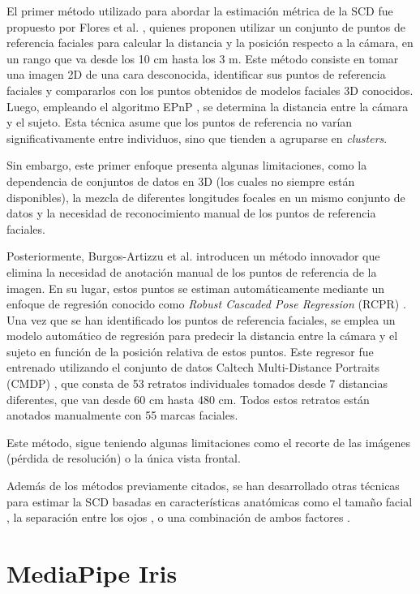 El primer método utilizado para abordar la estimación métrica de la SCD fue propuesto por Flores et al. \cite{28}, quienes proponen utilizar un conjunto de puntos de referencia faciales para calcular la distancia y la posición respecto a la cámara, en un rango que va desde los 10 cm hasta los 3 m.
Este método consiste en tomar una imagen 2D de una cara desconocida, identificar sus puntos de referencia faciales y compararlos con los puntos obtenidos de modelos faciales 3D conocidos. Luego, empleando el algoritmo EPnP \cite{29}, se determina la distancia entre la cámara y el sujeto. Esta técnica asume que los puntos de referencia no varían significativamente entre individuos, sino que tienden a agruparse en \textit{clusters}.

Sin embargo, este primer enfoque presenta algunas limitaciones, como la dependencia de conjuntos de datos en 3D (los cuales no siempre están disponibles), la mezcla de diferentes longitudes focales en un mismo conjunto de datos y la necesidad de reconocimiento manual de los puntos de referencia faciales.

Posteriormente, Burgos-Artizzu et al. \cite{30} introducen un método innovador que elimina la necesidad de anotación manual de los puntos de referencia de la imagen. En su lugar, estos puntos se estiman automáticamente mediante un enfoque de regresión conocido como \textit{Robust Cascaded Pose Regression} (RCPR) \cite{53}. Una vez que se han identificado los puntos de referencia faciales, se emplea un modelo automático de regresión para predecir la distancia entre la cámara y el sujeto en función de la posición relativa de estos puntos. Este regresor fue entrenado utilizando el conjunto de datos Caltech Multi-Distance Portraits (CMDP) \cite{54}, que consta de 53 retratos individuales tomados desde 7 distancias diferentes, que van desde 60 cm hasta 480 cm. Todos estos retratos están anotados manualmente con 55 marcas faciales.

Este método, sigue teniendo algunas limitaciones como el recorte de las imágenes (pérdida de resolución) o la única vista frontal.

Además de los métodos previamente citados, se han desarrollado otras técnicas para estimar la SCD basadas en características anatómicas como el tamaño facial \cite{32}, la separación entre los ojos \cite{33}, o una combinación de ambos factores \cite{34}.

\section{MediaPipe Iris}

